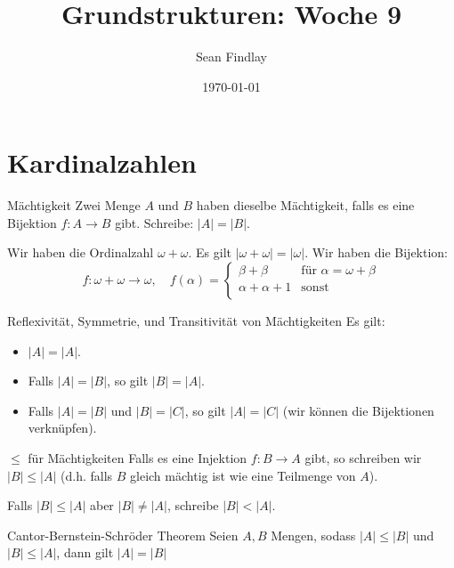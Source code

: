 \documentclass[12pt]{article}
\title{Grundstrukturen: Woche 9}
\author{Sean Findlay}
\date{\today}
\begin{document}
\maketitle

\section{Kardinalzahlen}

\begin{definition}{Mächtigkeit}{}
    Zwei Menge $A$ und $B$ haben dieselbe Mächtigkeit, falls es eine Bijektion $f: A \rightarrow B$ gibt. Schreibe: $|A| = |B|$.
\end{definition}

\begin{example}{}{}
    Wir haben die Ordinalzahl $\omega + \omega$. Es gilt $|\omega + \omega| = |\omega|$. Wir haben die Bijektion:
    $$
        f: \omega + \omega \rightarrow \omega, \quad f(\alpha) = \begin{cases}
            \beta + \beta & \text{für } \alpha = \omega + \beta \\
            \alpha + \alpha + 1 & \text{sonst} \\
        \end{cases}
    $$
\end{example}

\begin{remark}{Reflexivität, Symmetrie, und Transitivität von Mächtigkeiten}{}
    Es gilt:
    \begin{itemize}
        \item $|A| = |A|$.
        \item Falls $|A| = |B|$, so gilt $|B| = |A|$.
        \item Falls $|A| = |B|$ und $|B| = |C|$, so gilt $|A| = |C|$ (wir können die Bijektionen verknüpfen).
    \end{itemize}
\end{remark}

\begin{remark}{$\leq$ für Mächtigkeiten}{}
    Falls es eine Injektion $f: B \rightarrow A$ gibt, so schreiben wir $|B| \leq |A|$ (d.h. falls $B$ gleich mächtig ist wie eine Teilmenge von $A$).

    Falls $|B| \leq |A|$ aber $|B| \neq |A|$, schreibe $|B| < |A|$.
\end{remark}

\begin{theorem}{Cantor-Bernstein-Schröder Theorem}{}
    Seien $A, B$ Mengen, sodass $|A| \leq |B|$ und $|B| \leq |A|$, dann gilt $|A| = |B|$
\end{theorem}
\end{document}
